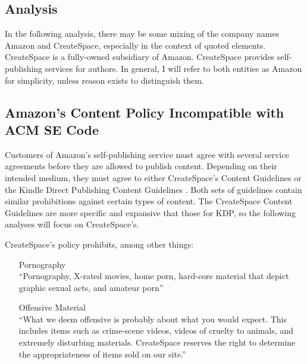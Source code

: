 \documentclass[11pt]{article}
\begin{document}
\begin{multicols}{2}
\section{Analysis}
In the following analysis, there may be some mixing of the company names Amazon and CreateSpace, especially in the context of quoted elements.  CreateSpace is a fully-owned subsidiary of Amazon.  CreateSpace provides self-publishing services for authors.  In general, I will refer to both entities as Amazon for simplicity, unless reason exists to distinguish them.

\subsection{Amazon's Content Policy Incompatible with ACM SE Code}

Customers of Amazon's self-publishing service must agree with several service agreements before they are allowed to publish content.  Depending on their intended medium, they must agree to either CreateSpace's Content Guidelines \cite{CreateSpaceContentGuidelines} or the Kindle Direct Publishing Content Guidelines \cite{AmazonKDPContentGuidelines}.  Both sets of guidelines contain similar prohibitions against certain types of content.  The CreateSpace Content Guidelines are more specific and expansive that those for KDP, so the following analyses will focus on CreateSpace's.


CreateSpace's policy prohibits, among other things:

\begin{itemize}
\item[Pornography] \hfill \\
      ``Pornography, X-rated movies, home porn, hard-core material that depict graphic sexual acts, and amateur porn''
\item[Offensive Material] \hfill \\
      ``What we deem offensive is probably about what you would expect. This includes items such as crime-scene videos, videos of cruelty to animals, and extremely disturbing materials. CreateSpace reserves the right to determine the appropriateness of items sold on our site.''


\end{itemize}
\end{multicols}
\end{document}
